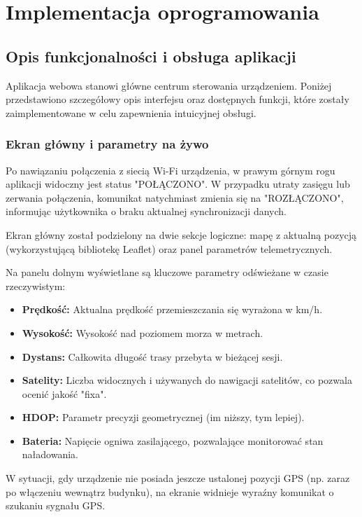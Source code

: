 \documentclass[12pt, a4paper]{EE-dyplom}
\begin{document}
\section{Implementacja oprogramowania}

\subsection{Opis funkcjonalności i obsługa aplikacji}
Aplikacja webowa stanowi główne centrum sterowania urządzeniem. Poniżej przedstawiono szczegółowy opis interfejsu oraz dostępnych funkcji, które zostały zaimplementowane w celu zapewnienia intuicyjnej obsługi.

\subsubsection{Ekran główny i parametry na żywo}

Po nawiązaniu połączenia z siecią Wi-Fi urządzenia, w prawym górnym rogu aplikacji widoczny jest status "POŁĄCZONO". W przypadku utraty zasięgu lub zerwania połączenia, komunikat natychmiast zmienia się na "ROZŁĄCZONO", informując użytkownika o braku aktualnej synchronizacji danych.

Ekran główny został podzielony na dwie sekcje logiczne: mapę z aktualną pozycją (wykorzystującą bibliotekę Leaflet) oraz panel parametrów telemetrycznych.

Na panelu dolnym wyświetlane są kluczowe parametry odświeżane w czasie rzeczywistym:
\begin{itemize}
    \item \textbf{Prędkość:} Aktualna prędkość przemieszczania się wyrażona w km/h.
    \item \textbf{Wysokość:} Wysokość nad poziomem morza w metrach.
    \item \textbf{Dystans:} Całkowita długość trasy przebyta w bieżącej sesji.
    \item \textbf{Satelity:} Liczba widocznych i używanych do nawigacji satelitów, co pozwala ocenić jakość "fixa".
    \item \textbf{HDOP:} Parametr precyzji geometrycznej (im niższy, tym lepiej).
    \item \textbf{Bateria:} Napięcie ogniwa zasilającego, pozwalające monitorować stan naładowania.
\end{itemize}

W sytuacji, gdy urządzenie nie posiada jeszcze ustalonej pozycji GPS (np. zaraz po włączeniu wewnątrz budynku), na ekranie widnieje wyraźny komunikat o szukaniu sygnału GPS.
\end{document}
